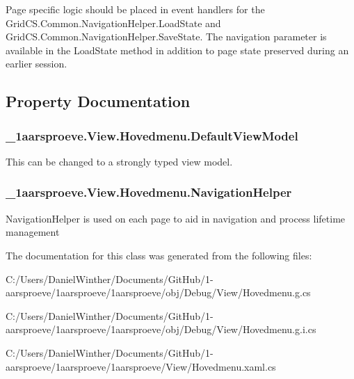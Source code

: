 Page specific logic should be placed in event handlers for the Grid\+C\+S.\+Common.\+Navigation\+Helper.\+Load\+State and Grid\+C\+S.\+Common.\+Navigation\+Helper.\+Save\+State. The navigation parameter is available in the Load\+State method in addition to page state preserved during an earlier session. 

\subsection{Property Documentation}
\hypertarget{class__1aarsproeve_1_1_view_1_1_hovedmenu_a190a68175b53527c294361f545270777}{}
\subsubsection[{Default\+View\+Model}]{ \+\_\+1aarsproeve.\+View.\+Hovedmenu.\+Default\+View\+Model\hspace{0.3cm}{\ttfamily [get]}}\label{class__1aarsproeve_1_1_view_1_1_hovedmenu_a190a68175b53527c294361f545270777}


This can be changed to a strongly typed view model. 

\hypertarget{class__1aarsproeve_1_1_view_1_1_hovedmenu_ac513dbcbc4b71272c5590cb997863925}{}
\subsubsection[{Navigation\+Helper}]{ \+\_\+1aarsproeve.\+View.\+Hovedmenu.\+Navigation\+Helper\hspace{0.3cm}{\ttfamily [get]}}\label{class__1aarsproeve_1_1_view_1_1_hovedmenu_ac513dbcbc4b71272c5590cb997863925}


Navigation\+Helper is used on each page to aid in navigation and process lifetime management 



The documentation for this class was generated from the following files\+:\begin{DoxyCompactItemize}
\item 
C\+:/\+Users/\+Daniel\+Winther/\+Documents/\+Git\+Hub/1-\/aarsproeve/1aarsproeve/1aarsproeve/obj/\+Debug/\+View/Hovedmenu.\+g.\+cs\item 
C\+:/\+Users/\+Daniel\+Winther/\+Documents/\+Git\+Hub/1-\/aarsproeve/1aarsproeve/1aarsproeve/obj/\+Debug/\+View/Hovedmenu.\+g.\+i.\+cs\item 
C\+:/\+Users/\+Daniel\+Winther/\+Documents/\+Git\+Hub/1-\/aarsproeve/1aarsproeve/1aarsproeve/\+View/Hovedmenu.\+xaml.\+cs\end{DoxyCompactItemize}
